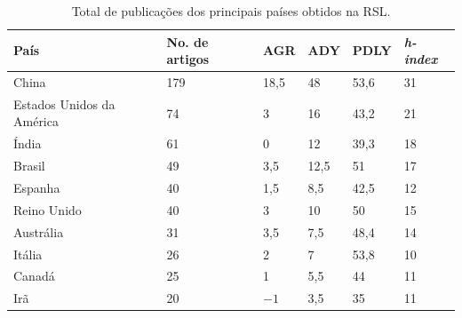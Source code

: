 \begin{table}[!htb]
	\centering
	\caption{Total de publicações dos principais países obtidos na RSL.}\label{tb:pais}
	\begin{tabular}{llllll}
		\toprule
		País & No. de artigos & AGR & ADY & PDLY & \textit{h-index} \\
		\midrule
		China & 179 & 18,5 & 48 & 53,6 & 31 \\
		Estados Unidos da América & 74 & 3 & 16 & 43,2 & 21 \\
		Índia & 61 & 0 & 12 & 39,3 & 18 \\
		Brasil & 49 & 3,5 & 12,5 & 51 & 17 \\
		Espanha & 40 & 1,5 & 8,5 & 42,5 & 12 \\
		Reino Unido & 40 & 3 & 10 & 50 & 15 \\
		Austrália & 31 & 3,5 & 7,5 & 48,4 & 14 \\
		Itália & 26 & 2 & 7 & 53,8 & 10 \\
		Canadá & 25 & 1 & 5,5 & 44 & 11 \\
		Irã & 20 & $-1$ & 3,5 & 35 & 11 \\
		\bottomrule
	\end{tabular}
\end{table}



